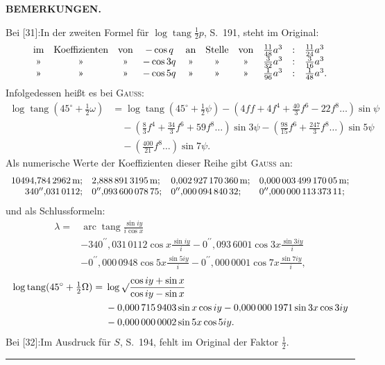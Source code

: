 \par\clearpage
\noindent{}\hfill{\small\textbf{BEMERKUNGEN.}}\hfill\null\par\medskip

{\small
\noindent Bei [31]:\quad In der zweiten Formel für \(\log\operatorname{tang}\tfrac12 p\), S.\ 191, steht im Original:
\[
\begin{array}{cccc@{\quad}ccc@{\quad}rcl}
\text{im}&\text{Koeffizienten}&\text{von}&-\cos q&
 \text{an}&\text{Stelle}&\text{von}&\tfrac{11}{48}a^3&:&\tfrac{11}{24}a^3\\
\text{»}&\text{»}&\text{»}&-\cos3q&
 \text{»}&\text{»}&\text{»}&\tfrac3{32}a^3&:&\tfrac3{16}a^3\\
\text{»}&\text{»}&\text{»}&-\cos5q&
 \text{»}&\text{»}&\text{»}&\tfrac1{96}a^3&:&\tfrac1{48}a^3.
\end{array}
\]
\noindent Infolgedessen heißt es bei \textsc{Gauss}:
\[
\begin{aligned}
\log\operatorname{tang}(45^\circ+\tfrac12\omega)
 &=\log\operatorname{tang}(45^\circ+\tfrac12\psi)
 -\left(4ff+4f^4+\frac{40}3f^6-22f^8\ldots\right)\sin\psi\\
 &\quad-\left(\frac83f^4+\frac{34}3f^6+59f^8\ldots\right)\sin3\psi
 -\left(\frac{98}{15}f^6+\frac{247}3f^8\ldots\right)\sin5\psi\\
 &\quad-\left(\frac{400}{21}f^8\ldots\right)\sin7\psi.
\end{aligned}
\]
\noindent Als numerische Werte der Koeffizienten dieser Reihe gibt \textsc{Gauss} an:
\[
\begin{array}{r@{\quad}l@{\quad}l@{\quad}l}
10494{,}784\,2962\,\mathrm m;&2{,}888\,891\,3195\,\mathrm m;&
0{,}002\,927\,170\,360\,\mathrm m;&0{,}000\,003\,499\,170\,05\,\mathrm m;\\
340^{\prime\prime}{,}031\,0112;&0^{\prime\prime}{,}093\,600\,078\,75;&
0^{\prime\prime}{,}000\,094\,840\,32;&0^{\prime\prime}{,}000\,000\,113\,373\,11;
\end{array}
\]
\noindent und als Schlussformeln:
\[
\begin{aligned}
\lambda={}&\operatorname{arc}\operatorname{tang}\frac{\sin iy}{i\cos x}\\
&-340^{\prime\prime}{,}031\,0112\cos x\frac{\sin iy}{i}
 -0^{\prime\prime}{,}093\,6001\cos3x\frac{\sin3iy}{i}\\
&-0^{\prime\prime}{,}000\,0948\cos5x\frac{\sin5iy}{i}
 -0^{\prime\prime}{,}000\,0001\cos7x\frac{\sin7iy}{i},
\end{aligned}
\]
\[
\begin{aligned}
\log\operatorname{tang}(45^\circ+\tfrac12\Omega)
={}&\log\surd\frac{\cos iy+\sin x}{\cos iy-\sin x}\\
&-0{,}000\,715\,9403\sin x\cos iy
 -0{,}000\,000\,1971\sin3x\cos3iy\\
&-0{,}000\,000\,0002\sin5x\cos5iy.
\end{aligned}
\]
\noindent Bei [32]:\quad Im Ausdruck für \(S\), S.\ 194, fehlt im Original der Faktor \(\tfrac12\).
\begin{center}\rule{.24\linewidth}{.4pt}\end{center}

}
